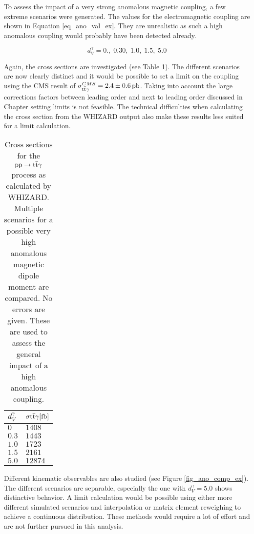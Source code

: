 To assess the impact of a very strong anomalous magnetic coupling, a few extreme scenarios were generated. The values for the electromagnetic coupling are shown in Equation \ref{eq_ano_val_ex}. They are unrealistic as such a high anomalous coupling would probably have been detected already.

\begin{equation}
d_V^{\gamma} = 0.,\; 0.30,\; 1.0,\;1.5,\; 5.0
\label{eq_ano_val_ex}
\end{equation}

Again, the cross sections are investigated (see Table \ref{tab_ano_crosssec_ex}). The different scenarios are now clearly distinct and it would be possible to set a limit on the coupling using the CMS result of $\sigma^{CMS}_{\ttgamma} = \SI{2.4 \pm 0.6}{\pico \barn}$\cite{CMS-PAS-TOP-13-011}. Taking into account the large corrections factors between leading order and next to leading order discussed in Chapter  setting limits is not feasible. The technical difficulties when calculating the cross section from the WHIZARD output also make these results less suited for a limit calculation. \\

\begin{table}[ht]
\centering
    \caption{Cross sections for the $\mathrm{pp} \to \mathrm{t}\overline{\mathrm{t}} \gamma$ process as calculated by WHIZARD. Multiple scenarios for a possible very high anomalous magnetic dipole moment are compared. No errors are given. These are used to assess the general impact of a high anomalous coupling.}
    \begin{tabular}{| l | l |}

    \hline
    $d_{V}^{\gamma}$ & $\sigma{\ttgamma} [\SI{}{\femto \barn}]$ \\
    \hline
    $0$ &  $1408$\\
    \hline
    $0.3$ & $1443 $ \\
    \hline
    $1.0$ & $1723 $ \\
    \hline
    $1.5$ & $2161 $ \\
    \hline
    $5.0$ &  $12874 $\\
    \hline
    \end{tabular}
     \label{tab_ano_crosssec_ex}
\end{table}

Different kinematic observables are also studied (see Figure \ref{fig_ano_comp_ex}). The different scenarios are separable, especially the one with $d_{V}^{\gamma} = 5.0$ shows distinctive behavior. A limit calculation would be possible using either more different simulated scenarios and interpolation or  matrix element reweighing to achieve a continuous distribution. These methods would require a lot of effort and are not further pursued in this analysis.

